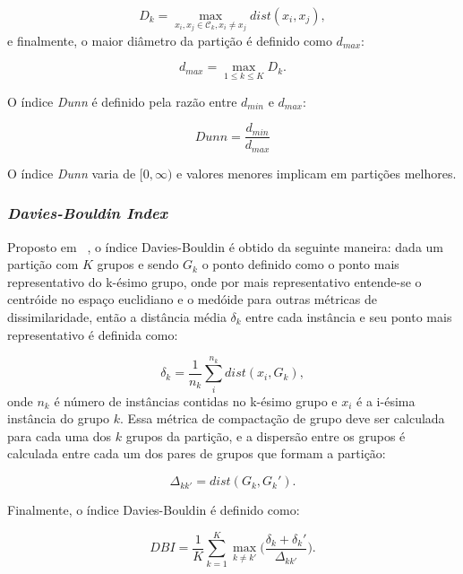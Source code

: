 \begin{equation}
D_k = \max_{x_i,x_j \in \mathcal{C}_k, x_i \neq x_j} dist(x_i,x_j),
\end{equation}
e finalmente, o maior diâmetro da partição é definido como $d_{max}$:

\begin{equation}
d_{max} = \max_{1\leq k \leq K} D_k.
\end{equation}

O índice \emph{Dunn} é definido pela razão entre $d_{min}$ e $d_{max}$:

\begin{equation}
Dunn = \frac{d_{min}}{d_{max}}
\end{equation}

O índice \emph{Dunn} varia de $[0,\infty)$ e valores menores implicam em partições melhores.

\subsubsection{\emph{Davies-Bouldin Index}}

Proposto em ~\parencite{DBI}, o índice Davies-Bouldin é obtido da seguinte maneira: dada um partição com $K$ grupos e sendo $G_k$ o ponto definido como o ponto mais representativo do k-ésimo grupo, onde por mais representativo entende-se o centróide no espaço euclidiano e o medóide para outras métricas de dissimilaridade, então a  distância média $\delta_k$ entre cada instância e seu ponto mais representativo é definida como:

\begin{equation}
\delta_k = \frac{1}{n_k}\sum_{i}^{n_k} dist(x_i,G_k),
\end{equation}
onde $n_k$ é número de instâncias contidas no k-ésimo grupo e $x_i$ é a i-ésima instância do grupo $k$. Essa métrica de compactação de grupo deve ser calculada para cada uma dos $k$ grupos da partição, e a dispersão entre os grupos é calculada entre cada um dos pares de grupos que formam a partição:

\begin{equation}
\Delta_{kk'} = dist(G_k,G_k').
\end{equation}

Finalmente, o índice Davies-Bouldin é definido como:

\begin{equation}
DBI = \frac{1}{K}\sum_{k=1}^{K} \max_{k \neq k'} \bigg( \frac{\delta_k + \delta_k'}{\Delta_{kk'}}  \bigg).
\end{equation}


